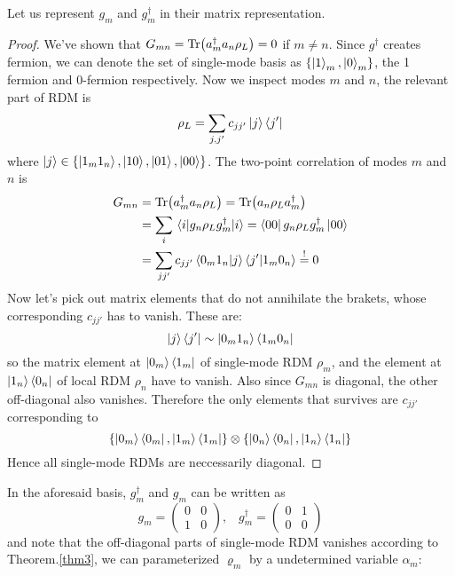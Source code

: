 \documentclass[11pt]{article}
\theoremstyle{remark}
\theoremstyle{definition}
\begin{document}
Let us represent $g_m$ and  $g_m^\dagger$ in their matrix representation. 
\begin{proof}
	We've shown that $G_{mn} = \Tr(a_m^\dagger a_n \rho_L) = 0$ if $m \neq n$. Since $g^\dagger$ creates fermion, we can denote the set of single-mode basis as $\{\ket{1}_m, \ket{0}_m\}$, the 1 fermion and 0-fermion respectively. Now we inspect modes $m$ and $n$, the relevant part of RDM is
	\begin{equation}
		\rho_L = \sum_{j,j'} c_{jj'}\ket{j}\bra{j'} 
	\end{equation}
	where $\ket{j} \in \{\ket{1_m1_n}, \ket{10},\ket{01}, \ket{00}\}$. The two-point correlation of modes $m$ and $n$ is
	\begin{equation}
		\begin{split}
		 	G_{mn} &= \Tr(a_m^\dagger a_n \rho_L) = \Tr(a_n \rho_L a_m^\dagger)\\
			       &= \sum_{i} \mel{i}{g_n \rho_L g_m^\dagger}{i} = \bra{00}g_n \rho_L g_m^\dagger \ket{00}\\
			       &= \sum_{jj'} c_{jj'}\braket{0_m 1_n}{j}\braket{j'}{1_m0_n}  \stackrel{!}{=} 0
		\end{split} 
	\end{equation}
	Now let's pick out matrix elements that do not annihilate the brakets, whose corresponding $c_{jj'}$ has to vanish.  These are:
	\[
		\ket{j}\bra{j'} \sim \ket{0_m 1_n} \bra{1_m 0_n} 
	\] 
	so the matrix element at $\ket{0_m}\bra{1_m}$ of single-mode RDM $\rho_m$, and the element at $\ket{1_n}\bra{0_n}$ of local RDM $\rho_n$ have to vanish. Also since $G_{mn}$ is diagonal, the other off-diagonal also vanishes. Therefore the only elements that survives are $c_{jj'}$ corresponding to
	 \[
		 \{\ket{0_m}\bra{0_m}, \ket{1_m}\bra{1_m}\} \otimes \{\ket{0_n}\bra{0_n}, \ket{1_n}\bra{1_n}\}
	\] 
	Hence all single-mode RDMs are neccessarily diagonal. 
\end{proof}
In the aforesaid basis, $g_m^\dagger$ and $g_m$ can be written as
\begin{equation}
	g_m = 
	\begin{pmatrix}
		0 & 0 \\ 1 & 0	
	\end{pmatrix},\;\;\;
	g_m^\dagger = 
	\begin{pmatrix}
		0 & 1 \\ 0 & 0 	
	\end{pmatrix}
\end{equation}
and note that the off-diagonal parts of single-mode RDM vanishes according to Theorem.\ref{thm3}, we can parameterized $\varrho_m$ by a undetermined variable  $\alpha_m$:
\end{document}
